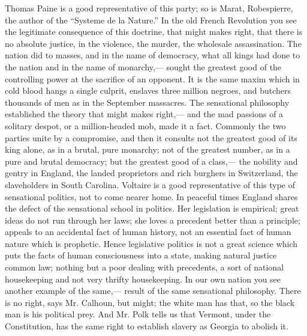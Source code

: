 \documentclass[12pt]{article}
\begin{document}
Thomas Paine is a good representative of this party; so is Marat, Robespierre, the author of the ``Systeme de la Nature.'' In the old French Revolution you see the legitimate consequence of this doctrine, that might makes right, that there is no absolute justice, in the violence, the murder, the wholesale assassination. The nation did to masses, and in the name of democracy, what all kings had done to the nation and in the name of monarchy,--- sought the greatest good of the controlling power at the sacrifice of an opponent. It is the same maxim which in cold blood hangs a single culprit, enslaves three million negroes, and butchers thousands of men as in the September massacres. The sensational philosophy established the theory that might makes right,--- and the mad passions of a solitary despot, or a million-headed mob, made it a fact. Commonly the two parties unite by a compromise, and then it consults not the greatest good of its king alone, as in a brutal, pure monarchy; not of the greatest number, as in a pure and brutal democracy; but the greatest good of a class,--- the nobility and gentry in England, the landed proprietors and rich burghers in Switzerland, the slaveholders in South Carolina. Voltaire is a good representative of this type of sensational politics, not to come nearer home. In peaceful times England shares the defect of the sensational school in politics. Her legislation is empirical; great ideas do not run through her laws; she loves a precedent better than a principle; appeals to an accidental fact of human history, not an essential fact of human nature which is prophetic. Hence legislative politics is not a great science which puts the facts of human consciousness into a state, making natural justice common law; nothing but a poor dealing with precedents, a sort of national housekeeping and not very thrifty housekeeping. In our own nation you see another example of the same,--- result of the same sensational philosophy. There is no right, says Mr. Calhoun, but might; the white man has that, so the black man is his political prey. And Mr. Polk tells us that Vermont, under the Constitution, has the same right to establish slavery as Georgia to abolish it. 
\end{document}
